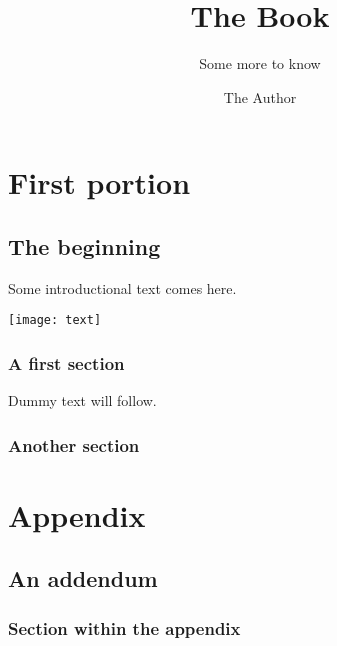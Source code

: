 \documentclass[fontsize=11pt,headings=small,
  parskip=half]{scrreprt}
\begin{document}
\title{The Book}
\subtitle{Some more to know}
\author{The Author}
\date{}
\maketitle
\tableofcontents 
\part{First portion}
\chapter{The beginning}
Some introductional text comes here.
\begin{center}
  \texttt{[image: text]}
\end{center}
\section{A first section}
Dummy text will follow.
\blindtext
\section{Another section}
\Blindtext
\appendix
\part{Appendix}
\chapter{An addendum}
\section{Section within the appendix}
\blindtext
\end{document}
